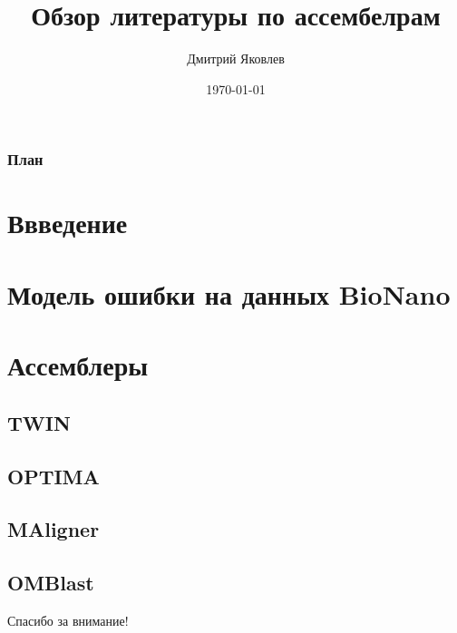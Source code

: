 \documentclass{beamer}
\title[Обзор литературы по ассембелрам]{Обзор литературы по ассембелрам}
\author{Дмитрий Яковлев}
\institute{EPAM Systems}
\date{\today}
\begin{document}
\begin{frame}
  \titlepage
\end{frame}

\begin{frame}
\frametitle{План}
\tableofcontents
\end{frame}

\section{Ввведение}


\section{Модель ошибки на данных BioNano}


\section{Ассемблеры}

\subsection{TWIN}


\subsection{OPTIMA}


\subsection{MAligner}


\subsection{OMBlast}





\begin{frame}

\begin{center}
\Huge Спасибо за внимание!
\end{center}

\end{frame}
\end{document}
